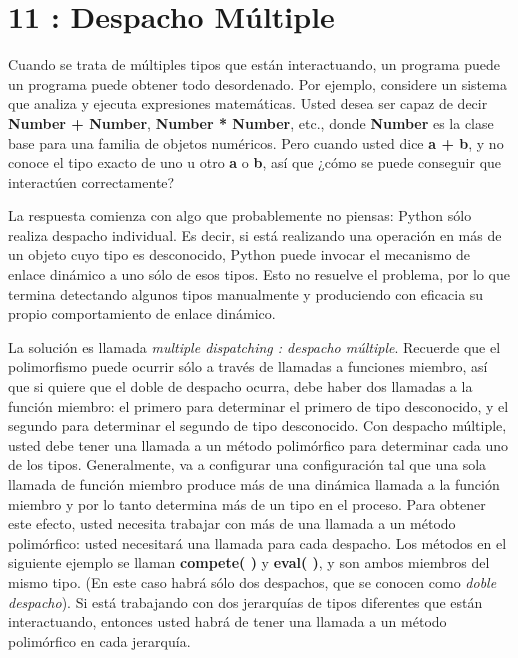 \section*{11 : Despacho Múltiple}
\label{sec:dm}

Cuando se trata de múltiples tipos que están interactuando, un programa puede un programa puede obtener todo desordenado. Por ejemplo, considere un sistema que analiza y ejecuta expresiones matemáticas. Usted desea ser capaz de decir \textbf{Number + Number}, \textbf{Number * Number}, etc., donde \textbf{Number} es la clase base para una familia de objetos numéricos. Pero cuando usted dice \textbf{a + b}, y no conoce el tipo exacto de uno u otro \textbf{a} o \textbf{b}, así que ¿cómo se puede conseguir que interactúen correctamente?  \newline

La respuesta comienza con algo que probablemente no piensas: Python sólo realiza despacho individual. Es decir, si está realizando una operación en más de un objeto cuyo tipo es desconocido, Python puede invocar el mecanismo de enlace dinámico a uno sólo de esos tipos. Esto no resuelve el problema, por lo que termina detectando algunos tipos manualmente y produciendo con eficacia su propio comportamiento de enlace dinámico.   \newline

La solución es llamada \textit{multiple dispatching : despacho múltiple}. Recuerde que el polimorfismo puede ocurrir sólo a través de llamadas a funciones miembro, así que si quiere que el doble de despacho ocurra, debe haber dos llamadas a la función miembro: el primero para determinar el primero de tipo desconocido, y el segundo para determinar el segundo de tipo desconocido. Con despacho múltiple, usted debe tener una llamada a un método polimórfico para determinar cada uno de los tipos. Generalmente, va a configurar una configuración tal que una sola llamada de función miembro produce más de una dinámica llamada a la función miembro y por lo tanto determina más de un tipo en el proceso. Para obtener este efecto, usted necesita trabajar con más de una llamada a un método polimórfico: usted necesitará una llamada para cada despacho. Los métodos en el siguiente ejemplo se llaman \textbf{compete( )} y \textbf{eval( )}, y son ambos miembros del mismo tipo. (En este caso habrá sólo dos despachos, que se conocen como \textit{doble despacho}). Si está trabajando con dos jerarquías de tipos diferentes que están interactuando, entonces usted habrá de tener una llamada a un método polimórfico en cada jerarquía.  \newline

